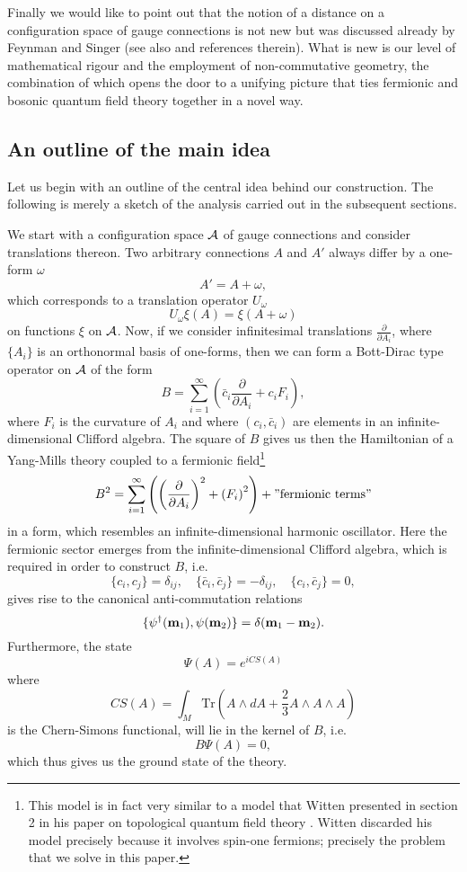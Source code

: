 \documentclass[12pt]{article}
\def\d{\delta}
\def\ca{{\cal A}}
\newcommand{\pa}{\partial}
\begin{document}
Finally we would like to point out that the notion of a distance on a configuration space of gauge connections is not new but
was discussed already by Feynman \cite{Feynman:1981ss} and Singer \cite{Singer:1981xw} (see also \cite{Orland:1996hm} and references therein). What is new is our level of mathematical rigour and the employment of non-commutative geometry, the combination of which opens the door to a unifying picture that ties fermionic and bosonic quantum field theory together in a novel way.








\subsection{An outline of the main idea}


Let us begin with an outline of the central idea behind our construction. The following is merely a sketch of the analysis carried out in the subsequent sections.

We start with a configuration space $\ca$ of gauge connections and consider translations thereon. Two arbitrary connections $A$ and $A'$ always differ by a one-form $\omega$
$$
A' = A+\omega,
$$
which corresponds to a translation operator $U_\omega$
$$
U_\omega \xi(A) = \xi(A+\omega)
$$
on functions $\xi$ on $\ca$. 
Now, if we consider infinitesimal translations $\frac{\pa}{\pa A_i}$, where $\{A_i\}$ is an orthonormal basis of one-forms, then we can form a Bott-Dirac type operator on $\ca$ of the form 
$$
B= \sum_{i=1}^\infty \left( \bar{c}_i \frac{\pa}{\pa A_i} + {c}_i F_i \right),
$$
where $F_i$ is the curvature of $A_i$ and where $(c_i,\bar{c}_i)$ are elements in an infinite-dimensional Clifford algebra. The square of $B$ gives us then the Hamiltonian of a Yang-Mills theory coupled to a fermionic field\footnote{This model is in fact very similar to a model that Witten presented in section 2 in his paper on topological quantum field theory \cite{Witten:1988ze}. Witten discarded his model precisely because it involves spin-one fermions; precisely the problem that we solve in this paper. }
$$
B^2 = \sum_{i=1}^\infty \left( \left(\frac{\pa}{\pa A_i}\right)^2 +  \left( F_i\right)^2 \right) + "\mbox{fermionic terms}"
$$
in a form, which resembles an infinite-dimensional harmonic oscillator. Here the fermionic sector emerges from the infinite-dimensional Clifford algebra, which is required in order to construct $B$, i.e.
$$
\{ c_i , {c}_j \} = \d_{ij},\quad \{ \bar{c}_i , \bar{c}_j \} = -\d_{ij},\quad \{ c_i , \bar{c}_j \} = 0,
$$
gives rise to the canonical anti-commutation relations
$$
\{  {\psi}^\dagger({\bf m}_1) , {\psi}({\bf m}_2) \} = \d({\bf m}_1-{\bf m}_2).
$$
Furthermore, the state
$$
\Psi(A) = e^{i CS(A)}
$$
where
$$
CS(A) = \int_M \mbox{Tr} \left( A\wedge dA + \frac{2}{3} A\wedge A \wedge A \right)
$$
is the Chern-Simons functional, will lie in the kernel of $B$, i.e.
$$
B \Psi(A) =0,
$$
which thus gives us the ground state of the theory.
\end{document}
